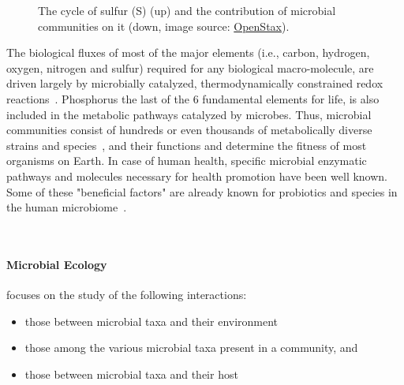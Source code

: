 \begin{figure}[!h]
         \caption[The cycle of S and the role of microbial communities]{
            The cycle of sulfur (S) (up) and the contribution of microbial communities on it (down, image source: \href{https://openstax.org/resources/3002d0fba25221d24455917117482a079a11f321}{OpenStax}).
         }
         \label{fig:co2}
      \end{figure}

      The biological fluxes of most of the major elements (i.e., carbon, hydrogen, oxygen, nitrogen and sulfur) required
      for any biological macro-molecule,
      are driven largely
      by microbially catalyzed, thermodynamically constrained redox reactions~\cite{falkowski2008microbial}. 
      Phosphorus the last of the 6 fundamental elements for life, is also included in the metabolic pathways catalyzed by microbes. 
      Thus, microbial communities consist of hundreds or even thousands of metabolically diverse strains and species~\cite{leventhal2018strain},
      and their functions
      and determine the fitness of most organisms on Earth. 
      In case of human health, specific microbial enzymatic pathways and molecules necessary for health promotion have been well known.
      Some of these "beneficial factors" are already known for probiotics and species in the human microbiome~\cite{marco2021defining}.



      ~\cite{louca2018function}
      


      \paragraph{Microbial Ecology} focuses on the study of the following interactions: 
      \begin{itemize}
         \setlength\itemsep{0.05em}
         \item those between microbial taxa and their environment
         \item those among the various microbial taxa present in a community, and
         \item those between microbial taxa and their host~\cite{isme}
      \end{itemize}


